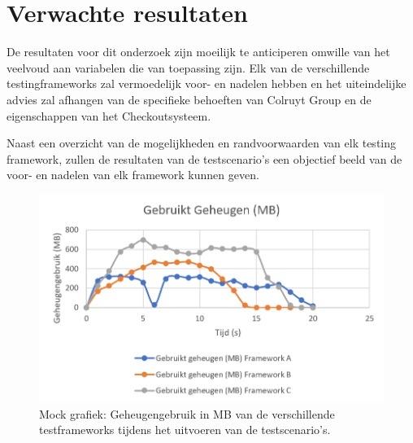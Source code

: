
\section{Verwachte resultaten}
\label{sec:verwachte_resultaten}

De resultaten voor dit onderzoek zijn moeilijk te anticiperen omwille van het veelvoud aan variabelen die van toepassing zijn. Elk van de verschillende testingframeworks zal vermoedelijk voor- en nadelen hebben en het uiteindelijke advies zal afhangen van de specifieke behoeften van Colruyt Group en de eigenschappen van het Checkoutsysteem.

Naast een overzicht van de mogelijkheden en randvoorwaarden van elk testing framework, zullen de resultaten van de testscenario's een objectief beeld van de voor- en nadelen van elk framework kunnen geven.

    \begin{figure}[h!]
    \includegraphics[width=\linewidth]{img/gebruiktgeheugen.PNG}
    \caption{Mock grafiek: Geheugengebruik in MB van de verschillende testframeworks tijdens het uitvoeren van de testscenario's.}
    \label{fig:geheugenmock}
    \end{figure}

